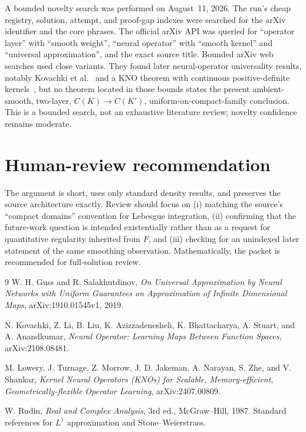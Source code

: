\documentclass[11pt]{article}
\begin{document}
A bounded novelty search was performed on August~11, 2026.  The run's cheap
registry, solution, attempt, and proof-gap indexes were searched for the arXiv
identifier and the core phrases.  The official arXiv API was queried for
``operator layer'' with ``smooth weight'', ``neural operator'' with ``smooth
kernel'' and ``universal approximation'', and the exact source title.  Bounded
arXiv web searches used close variants.  They found later neural-operator
universality results, notably Kovachki et al.~\cite{Kovachki} and a KNO theorem
with continuous positive-definite kernels~\cite{KNO}, but no theorem located
in those bounds states the present ambient-smooth, two-layer,
$C(K)\to C(K')$, uniform-on-compact-family conclusion.  This is a bounded
search, not an exhaustive literature review; novelty confidence remains
moderate.

\section{Human-review recommendation}

The argument is short, uses only standard density results, and preserves the
source architecture exactly.  Review should focus on (i) matching the source's
``compact domains'' convention for Lebesgue integration, (ii) confirming that
the future-work question is intended existentially rather than as a request
for quantitative regularity inherited from $F$, and (iii) checking for an
unindexed later statement of the same smoothing observation.  Mathematically,
the packet is recommended for full-solution review.

\begin{thebibliography}{9}
W. H. Guss and R. Salakhutdinov,
\emph{On Universal Approximation by Neural Networks with Uniform Guarantees on
Approximation of Infinite Dimensional Maps}, arXiv:1910.01545v1, 2019.

N. Kovachki, Z. Li, B. Liu, K. Azizzadenesheli, K. Bhattacharya, A. Stuart,
and A. Anandkumar,
\emph{Neural Operator: Learning Maps Between Function Spaces},
arXiv:2108.08481.

M. Lowery, J. Turnage, Z. Morrow, J. D. Jakeman, A. Narayan, S. Zhe, and
V. Shankar,
\emph{Kernel Neural Operators (KNOs) for Scalable, Memory-efficient,
Geometrically-flexible Operator Learning}, arXiv:2407.00809.

W. Rudin, \emph{Real and Complex Analysis}, 3rd ed., McGraw--Hill, 1987.
Standard references for $L^1$ approximation and Stone--Weierstrass.
\end{thebibliography}
\end{document}
